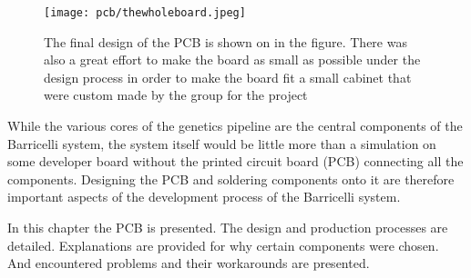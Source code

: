 \begin{figure}
\centering
\texttt{[image: pcb/thewholeboard.jpeg]}
\caption{The final design of the PCB is shown on in the figure. There was also a great effort to make the board as small as possible under the design process in order to make the board fit a small cabinet that were custom made by the group for the project }
\label{figure:thewholeboard}
\end{figure}

While the various cores of the genetics pipeline are the central components of the Barricelli system, the system itself would be little more than a simulation on some developer board without the printed circuit board (PCB) connecting all the components.
Designing the PCB and soldering components onto it are therefore important aspects of the development process of the Barricelli system.

In this chapter the PCB is presented.
The design and production processes are detailed.
Explanations are provided for why certain components were chosen.
And encountered problems and their workarounds are presented.

 \label{pcb:section:design_choices}

 \label{pcb:section:power_supply}

 \label{pcb:section:power_plane}

 \label{pcb:section:footprints}

 \label{pcb:section:budget}

 \label{pcb:section:process}

 \label{pcb:section:problems_and_workaround}

